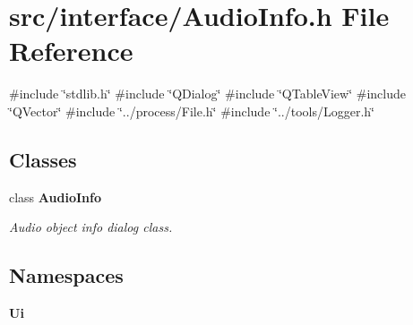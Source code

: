 \section{src/interface/\+Audio\+Info.h File Reference}
\label{_audio_info_8h}
{\ttfamily \#include \char`\"{}stdlib.\+h\char`\"{}}\newline
{\ttfamily \#include \char`\"{}Q\+Dialog\char`\"{}}\newline
{\ttfamily \#include \char`\"{}Q\+Table\+View\char`\"{}}\newline
{\ttfamily \#include \char`\"{}Q\+Vector\char`\"{}}\newline
{\ttfamily \#include \char`\"{}../process/\+File.\+h\char`\"{}}\newline
{\ttfamily \#include \char`\"{}../tools/\+Logger.\+h\char`\"{}}\newline
\subsection*{Classes}
\begin{DoxyCompactItemize}
\item 
class \textbf{ Audio\+Info}
\begin{DoxyCompactList}\small\item\em Audio object info dialog class. \end{DoxyCompactList}\end{DoxyCompactItemize}
\subsection*{Namespaces}
\begin{DoxyCompactItemize}
\item 
 \textbf{ Ui}
\end{DoxyCompactItemize}
